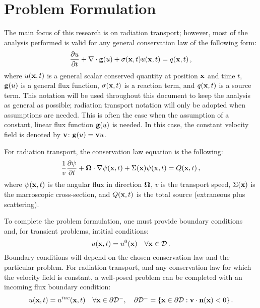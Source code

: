 \section{Problem Formulation}
The main focus of this research is on radiation transport;
however, most of the analysis performed is valid
for any general conservation law of the following form:
\begin{equation}\label{eq:cons_law}
   \frac{\partial u}{\partial t} + \nabla\cdot\mathbf{g}(u) + \sigma(\mathbf{x},t) u(\mathbf{x},t) = q(\mathbf{x},t) \,,
\end{equation}
where $u(\mathbf{x},t)$ is a general scalar conserved quantity at position $\mathbf{x}$
and time $t$, $\mathbf{g}(u)$ is a general flux function,
$\sigma(\mathbf{x},t)$ is a reaction term, and $q(\mathbf{x},t)$ is a source
term. This notation will be used throughout this document to keep
the analysis as general as possible; radiation transport notation
will only be adopted when assumptions are needed. This is often the case when
the assumption of a constant, linear flux function $\mathbf{g}(u)$ is needed.
In this case, the constant velocity field is denoted by $\mathbf{v}$: $\mathbf{g}(u)=\mathbf{v} u$.

For radiation transport, the conservation law equation is the following:
\begin{equation}\label{eq:rad_transport}
  \frac{1}{v}\frac{\partial \psi}{\partial t} + \mathbf{\Omega}\cdot\nabla\psi(\mathbf{x},t)
  + \Sigma(\mathbf{x})\psi(\mathbf{x},t) = Q(\mathbf{x},t) \,,
\end{equation}
where $\psi(\mathbf{x},t)$ is the angular flux in direction $\mathbf{\Omega}$,
$v$ is the transport speed, $\Sigma(\mathbf{x})$
is the macroscopic cross-section, and $Q(\mathbf{x},t)$ is the
total source (extraneous plus scattering).

To complete the problem formulation, one must provide boundary
conditions and, for transient problems, intitial conditions:
\begin{equation}
   u(\mathbf{x},t) = u^0(\mathbf{x})  \quad \forall \mathbf{x}\in\mathcal{D} \,.
\end{equation}
Boundary conditions will depend on the chosen conservation law and
the particular problem. 
For radiation transport, and any conservation law for which the velocity field
is constant, a well-posed problem can be completed with an incoming flux
boundary condition:
\begin{equation}
   u(\mathbf{x},t) = u^{inc}(\mathbf{x},t)  \quad \forall \mathbf{x}\in \partial\mathcal{D}^-,
     \quad \partial\mathcal{D}^- = \{\mathbf{x}\in\partial\mathcal{D}:
     \mathbf{v}\cdot\mathbf{n}(\mathbf{x})<0\} \,.
\end{equation}
